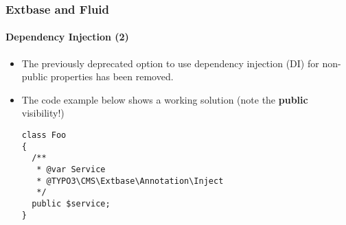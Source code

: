 %

\begin{frame}[fragile]
	\frametitle{Extbase and Fluid}
	\framesubtitle{Dependency Injection (2)}


	\begin{itemize}
		\item The previously deprecated option to use dependency injection (DI)
			for non-public properties has been removed.
		\item The code example below shows a working solution\newline
			\small(note the \textbf{public} visibility!)\normalsize
\begin{lstlisting}
class Foo
{
  /**
   * @var Service
   * @TYPO3\CMS\Extbase\Annotation\Inject
   */
  public $service;
}
\end{lstlisting}

	\end{itemize}

\end{frame}

